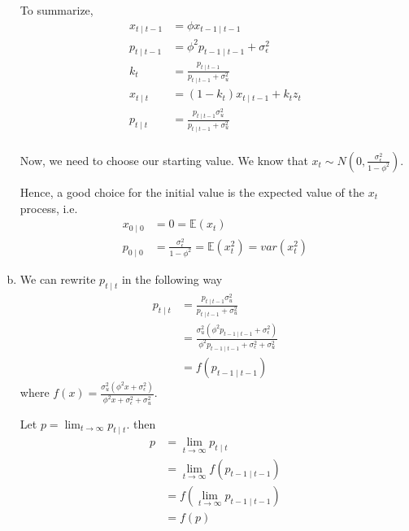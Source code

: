 \documentclass[12pt]{article}
\theoremstyle{definition}
\newcommand\E{\mathbb{E}}
\begin{document}
\begin{enumerate}[(a)]
	To summarize,
	\begin{align*}
		x_{t\mid t-1} &= \phi 	x_{t-1\mid t-1}\\
		p_{t\mid t-1} &= \phi^2 	p_{t-1\mid t-1}+\sigma_\epsilon^2\\
		k_t &= \frac{p_{t\mid t-1}}{p_{t\mid t-1}+\sigma_u^2}\\
		x_{t\mid t} &= (1-k_t)x_{t\mid t-1}+k_tz_t\\
		p_{t\mid t} &= \frac{p_{t\mid t-1}\sigma_u^2}{ p_{t\mid t-1}+\sigma_u^2}\\
	\end{align*}
	
	Now, we need to choose our starting value. We know that $x_t\sim N(0,\frac{\sigma^2_\epsilon}{1-\phi^2})$.
	
	Hence, a good choice for the initial value is the expected value of the $x_t$ process, i.e.
	\begin{align*}
		x_{0\mid 0} &= 0 = \E(x_t)\\
		p_{0\mid 0} &= \frac{\sigma^2_\epsilon}{1-\phi^2} = \E(x_t^2) =var(x_t^2)
	\end{align*}
	
	\item
	
	We can rewrite $p_{t\mid t}$ in the following way
	\begin{align*}
		p_{t\mid t} & = \frac{p_{t\mid t-1}\sigma_u^2}{ p_{t\mid t-1}+\sigma_u^2}\\
		&= \frac{\sigma_u^2\left(\phi^2 p_{t-1\mid t-1}+\sigma_\epsilon^2\right)}{\phi^2 p_{t-1\mid t-1}+\sigma_\epsilon^2+\sigma_u^2}\\
		& = f(p_{t-1\mid t-1})
	\end{align*}
	where $f(x) = \frac{\sigma_u^2\left(\phi^2x+\sigma_\epsilon^2\right)}{\phi^2 x+\sigma_\epsilon^2+\sigma_u^2}$.
	
	Let $p=\lim_{t\to \infty}p_{t\mid t}$. then	
	\begin{align*}
	p & = \lim_{t\to \infty}p_{t\mid t}\\
	& = \lim_{t\to \infty}f(p_{t-1\mid t-1})\\
	& = f(\lim_{t\to \infty}p_{t-1\mid t-1})\\
	& = f(p)
	\end{align*}
	

\end{enumerate}
\end{document}
